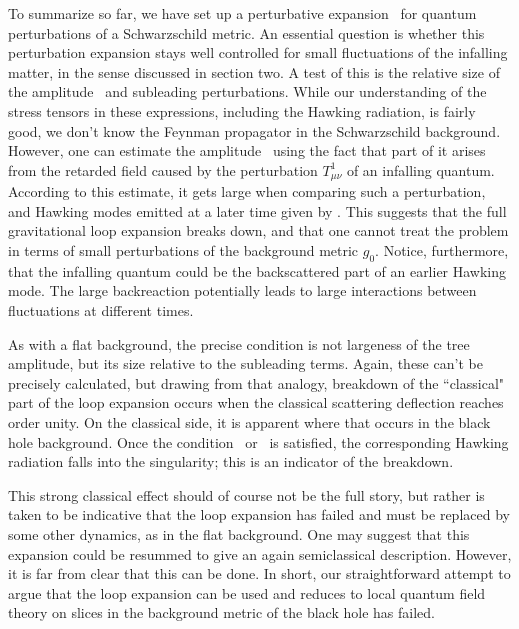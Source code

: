 To summarize so far, we have set up a perturbative expansion \gravpert\ for quantum perturbations of a Schwarzschild metric.  An essential question is whether this perturbation expansion stays well controlled for small fluctuations of the infalling matter, in the sense discussed in section two.  A test of this is the relative size of the amplitude \treeM\ and subleading perturbations.  While our understanding of the stress tensors in these expressions, including the Hawking radiation, is fairly good, we don't know the Feynman propagator in the Schwarzschild background.  However, one can estimate the amplitude \treeM\ using the fact that part of it arises from the retarded field caused by the perturbation $T^1_{\mu\nu}$ of an infalling quantum.  According to this estimate, it gets large when comparing such a perturbation, and Hawking modes emitted at a later time given by \rettime.  This suggests that the full gravitational loop expansion breaks down, and that one cannot treat the problem in terms of small perturbations of the background metric $g_0$.  Notice, furthermore, that the infalling quantum could be the backscattered part of an earlier Hawking mode.   The large backreaction potentially leads to large interactions between fluctuations at different times.

As with a flat background, the precise condition is not largeness of the tree amplitude, but its size relative to the subleading terms.  Again, these can't be precisely calculated, but drawing from that analogy, breakdown of the ``classical" part of the loop expansion occurs when the classical scattering deflection reaches order unity.  On the classical side, it is apparent where that occurs in the black hole background.  Once the condition \retV\ or \rettime\ is satisfied, the corresponding Hawking radiation falls into the singularity; this is an indicator of the breakdown.

This strong classical effect should of course not be the full story, but rather is taken to be indicative that the loop expansion has failed and must be replaced by some other dynamics, as in the flat background.  One may suggest that this expansion could be resummed to give an again semiclassical description.  However, it is far from clear that this can be done.  In short, our straightforward attempt to argue that the loop expansion can be used and reduces to local quantum field theory on slices in the background metric of the black hole has failed.

